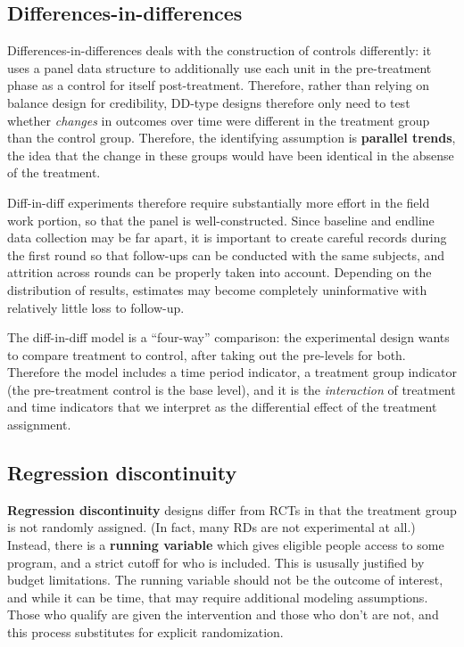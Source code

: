 \subsection{Differences-in-differences}

Differences-in-differences
deals with the construction of controls differently:
it uses a panel data structure to additionally use each
unit in the pre-treatment phase as a control for itself post-treatment.\cite{mckenzie2012beyond}
Therefore, rather than relying on balance design for credibility,
DD-type designs therefore only need to test whether \textit{changes}
in outcomes over time were different in the treatment group than the control group.
Therefore, the identifying assumption is \textbf{parallel trends},
the idea that the change in these groups would have been identical
in the absense of the treatment.

Diff-in-diff experiments therefore require substantially more effort
in the field work portion, so that the panel is well-constructed.
Since baseline and endline data collection may be far apart,
it is important to create careful records during the first round
so that follow-ups can be conducted with the same subjects,
and attrition across rounds can be properly taken into account.
Depending on the distribution of results,
estimates may become completely uninformative
with relatively little loss to follow-up.

The diff-in-diff model is a ``four-way'' comparison:
the experimental design wants to compare treatment to control,
after taking out the pre-levels for both.
Therefore the model includes a time period indicator,
a treatment group indicator (the pre-treatment control is the base level),
and it is the \textit{interaction} of treatment and time indicators
that we interpret as the differential effect of the treatment assignment.

\subsection{Regression discontinuity}

\textbf{Regression discontinuity} designs differ from RCTs
in that the treatment group is not randomly assigned.
(In fact, many RDs are not experimental at all.)
Instead, there is a \textbf{running variable}
which gives eligible people access to some program,
and a strict cutoff for who is included.
This is ususally justified by budget limitations.
The running variable should not be the outcome of interest,
and while it can be time, that may require additional modeling assumptions.
Those who qualify are given the intervention and those who don't are not,
and this process substitutes for explicit randomization.

